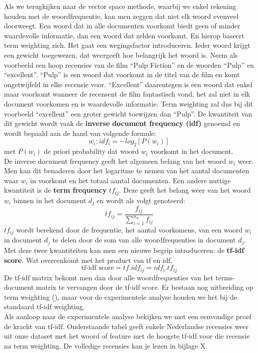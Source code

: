 Als we terugkijken naar de vector space methode, waarbij we enkel rekening houden met de woordfrequentie, kan men zeggen dat niet elk woord evenveel doorweegt. Een woord dat in alle documenten voorkomt biedt geen of minder waardevolle informatie, dan een woord dat zelden voorkomt. En hierop baseert term weighting zich. Het gaat een wegingsfactor introduceren. Ieder woord krijgt een gewicht toegewezen, dat weergeeft hoe belangrijk het woord is. Neem als voorbeeld een hoop recensies van de film ``Pulp Fiction'' en de woorden ``Pulp'' en ``excellent''. ``Pulp'' is een woord dat voorkomt in de titel van de film en komt ongetwijfeld in elke recensie voor. ``Excellent'' daarentegen is een woord dat enkel maar voorkomt wanneer de recensent de film fantastisch vond, het zal niet in elk document voorkomen en is waardevolle informatie. Term weighting zal dus bij dit voorbeeld ``excellent'' een groter gewicht toewijzen dan ``Pulp''. 
%
De kwantiteit van dit gewicht wordt vaak de \textbf{inverse document frequency  (idf)} genoemd en wordt bepaald aan de hand van volgende formule:
\[w_{i}: idf_{i} = -log_{2}[P(w_{i})] \]
met $P(w_{i})$ de priori probability dat woord $w_{i}$ voorkomt in het document.\\
%
De inverse document frequency geeft het algemeen belang van het woord $w_{i}$ weer. Men kan dit benaderen door het logaritme te nemen van het aantal documenten waar $w_{i}$ in voorkomt en het totaal aantal documenten.
Een andere nuttige kwantiteit is de  \textbf{term frequency} $tf_{ij}$. Deze geeft het belang weer van het woord $w_{i}$ binnen in het document $d_{j}$  en wordt als volgt genoteerd:
\[ tf_{ij} = \frac{f_{ij}}{ \sum_{i=1}^{n_{w}}f_{ij}} \]
%
$tf_{ij}$ wordt berekend door de frequentie, het aantal voorkomens, van een woord $w_{i}$ in document $d_{j}$ te delen door de som van alle woordfrequenties in document $d_{j}$.
Met deze twee kwantiteiten kan men een nieuwe begrip introduceren: de \textbf{tf-idf score}. Wat overeenkomt met het product van tf en idf.
\[ \text{tf-idf score} = tf . idf_{ij} = idf_{i} . tf_{ij} \]
%
De tf-idf matrix bekomt men dan door alle woordfrequenties van het terms-document matrix te vervangen door de tf-idf score.
Er bestaan nog uitbreiding op term weighting (\cite{paltoglou2010study}), maar voor de experimentele analyse houden we het bij de standaard tf-idf weighting.\\

Als aanloop naar de experimentele analyse bekijken we met een eenvoudige proef de kracht van tf-idf. Onderstaande tabel geeft enkele Nederlandse recensies weer uit onze dataset met het woord of feature met de hoogste tf-idf voor die recensie na term weighting. De volledige recensies kan je lezen in bijlage X.

